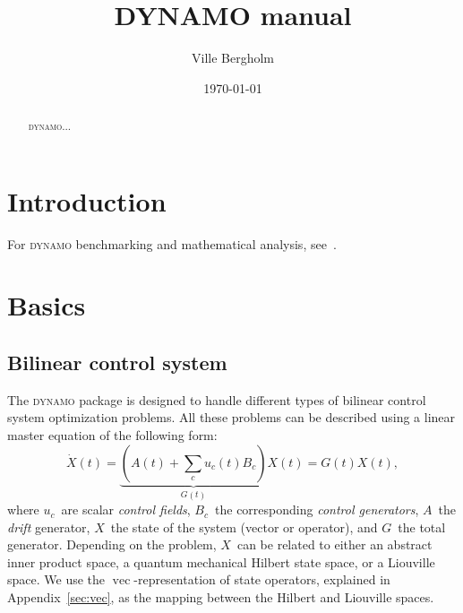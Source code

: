\documentclass[aps, pra, a4paper, longbibliography, superscriptaddress]{revtex4-1}
\newcommand{\be}{\begin{equation}}
\newcommand{\ee}{\end{equation}}
\DeclareMathOperator{\cvec}{vec}
\newcommand{\DYNAMO}{\textsc{dynamo}}
\begin{document}
\title{DYNAMO manual}
\date{\today}

\author{Ville Bergholm}


\begin{abstract}
\DYNAMO{}...
\end{abstract}
\maketitle



\tableofcontents


\section{Introduction}

For \DYNAMO{} benchmarking and mathematical analysis, see~\cite{machnes_2011}.



\section{Basics}

\subsection{Bilinear control system}
The \DYNAMO{} package is designed to handle different types of bilinear
control system optimization problems.
All these problems can be described using a linear master equation of
the following form:
\be
\label{eq:master}
\dot{X}(t) = \underbrace{\left(A(t) +\sum_{c} u_c(t) B_c\right)}_{G(t)} X(t) = G(t) X(t),
\ee
where $u_c$~are scalar \emph{control fields}, $B_c$~the
corresponding \emph{control generators},
$A$~the \emph{drift} generator, $X$~the state of the system (vector or operator),
and $G$~the total generator.
Depending on the problem,
$X$~can be related to either an abstract
inner product space, a quantum mechanical Hilbert state space,
or a Liouville space.
We use the $\cvec$-representation of state
operators, explained in Appendix~\ref{sec:vec},
as the mapping between the Hilbert and Liouville spaces.
\end{document}

